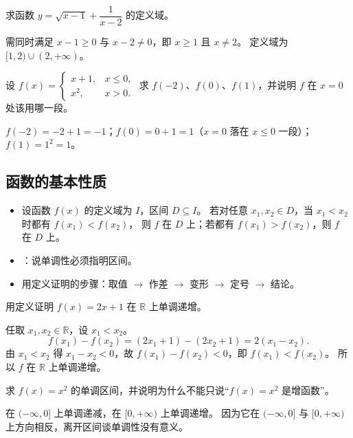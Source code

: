 \begin{explore}
\begin{example}
求函数 $y=\sqrt{x-1}+\dfrac{1}{x-2}$ 的定义域。
\end{example}
\begin{solution}
需同时满足 $x-1\geq0$ 与 $x-2\neq0$，即 $x\geq1$ 且 $x\neq2$。
定义域为 $[1,2)\cup(2,+\infty)$。
\end{solution}

\begin{problem}
设 $f(x)=\begin{cases}x+1,&x\leq0,\\ x^2,&x>0.\end{cases}$
求 $f(-2)$、$f(0)$、$f(1)$，并说明 $f$ 在 $x=0$ 处该用哪一段。
\end{problem}
\begin{solution}
$f(-2)=-2+1=-1$；$f(0)=0+1=1$（$x=0$ 落在 $x\leq0$ 一段）；$f(1)=1^2=1$。
\end{solution}

\subsection{函数的基本性质}

\begin{itemize}
  \item 设函数 $f(x)$ 的定义域为 $I$，区间 $D\subseteq I$。
        若对任意 $x_1,x_2\in D$，当 $x_1<x_2$ 时都有 $f(x_1)<f(x_2)$，
        则 $f$ 在 $D$ 上；若都有 $f(x_1)>f(x_2)$，则 $f$ 在 $D$ 上。
  \item {}：说单调性必须指明区间。
  \item 用定义证明的步骤：取值 $\to$ 作差 $\to$ 变形 $\to$ 定号 $\to$ 结论。
\end{itemize}

\begin{example}
用定义证明 $f(x)=2x+1$ 在 $\mathbb{R}$ 上单调递增。
\end{example}
\begin{solution}
任取 $x_1,x_2\in\mathbb{R}$，设 $x_1<x_2$。
\[
  f(x_1)-f(x_2)=(2x_1+1)-(2x_2+1)=2(x_1-x_2).
\]
由 $x_1<x_2$ 得 $x_1-x_2<0$，故 $f(x_1)-f(x_2)<0$，即 $f(x_1)<f(x_2)$。
所以 $f$ 在 $\mathbb{R}$ 上单调递增。
\end{solution}

\begin{problem}
求 $f(x)=x^2$ 的单调区间，并说明为什么不能只说“$f(x)=x^2$ 是增函数”。
\end{problem}
\begin{solution}
在 $(-\infty,0]$ 上单调递减，在 $[0,+\infty)$ 上单调递增。
因为它在 $(-\infty,0]$ 与 $[0,+\infty)$ 上方向相反，离开区间谈单调性没有意义。
\end{solution}


\end{explore}
